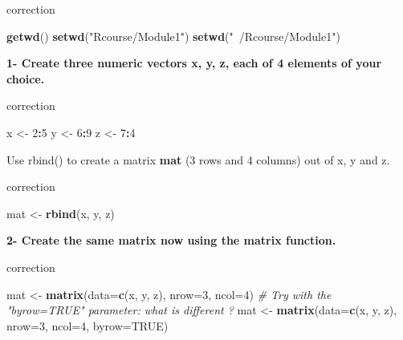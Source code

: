 \documentclass[]{book}
\newenvironment{Shaded}{\begin{snugshade}}{\end{snugshade}}
\newcommand{\CommentTok}[1]{\textcolor[rgb]{0.56,0.35,0.01}{\textit{#1}}}
\newcommand{\DataTypeTok}[1]{\textcolor[rgb]{0.13,0.29,0.53}{#1}}
\newcommand{\DecValTok}[1]{\textcolor[rgb]{0.00,0.00,0.81}{#1}}
\newcommand{\KeywordTok}[1]{\textcolor[rgb]{0.13,0.29,0.53}{\textbf{#1}}}
\newcommand{\NormalTok}[1]{#1}
\newcommand{\OperatorTok}[1]{\textcolor[rgb]{0.81,0.36,0.00}{\textbf{#1}}}
\newcommand{\OtherTok}[1]{\textcolor[rgb]{0.56,0.35,0.01}{#1}}
\newcommand{\StringTok}[1]{\textcolor[rgb]{0.31,0.60,0.02}{#1}}
\begin{document}
correction

\begin{Shaded}
\begin{Highlighting}[]
\KeywordTok{getwd}\NormalTok{()}
\KeywordTok{setwd}\NormalTok{(}\StringTok{"Rcourse/Module1"}\NormalTok{)}
\KeywordTok{setwd}\NormalTok{(}\StringTok{"~/Rcourse/Module1"}\NormalTok{)}
\end{Highlighting}
\end{Shaded}

\textbf{1- Create three numeric vectors x, y, z, each of 4 elements of your choice.}

correction

\begin{Shaded}
\begin{Highlighting}[]
\NormalTok{x <-}\StringTok{ }\DecValTok{2}\OperatorTok{:}\DecValTok{5}
\NormalTok{y <-}\StringTok{ }\DecValTok{6}\OperatorTok{:}\DecValTok{9}
\NormalTok{z <-}\StringTok{ }\DecValTok{7}\OperatorTok{:}\DecValTok{4}
\end{Highlighting}
\end{Shaded}

Use rbind() to create a matrix \textbf{mat} (3 rows and 4 columns) out of x, y and z.

correction

\begin{Shaded}
\begin{Highlighting}[]
\NormalTok{mat <-}\StringTok{ }\KeywordTok{rbind}\NormalTok{(x, y, z)}
\end{Highlighting}
\end{Shaded}

\textbf{2- Create the same matrix now using the matrix function.}

correction

\begin{Shaded}
\begin{Highlighting}[]
\NormalTok{mat <-}\StringTok{ }\KeywordTok{matrix}\NormalTok{(}\DataTypeTok{data=}\KeywordTok{c}\NormalTok{(x, y, z), }\DataTypeTok{nrow=}\DecValTok{3}\NormalTok{, }\DataTypeTok{ncol=}\DecValTok{4}\NormalTok{)}
\CommentTok{# Try with the "byrow=TRUE" parameter: what is different ?}
\NormalTok{mat <-}\StringTok{ }\KeywordTok{matrix}\NormalTok{(}\DataTypeTok{data=}\KeywordTok{c}\NormalTok{(x, y, z), }\DataTypeTok{nrow=}\DecValTok{3}\NormalTok{, }\DataTypeTok{ncol=}\DecValTok{4}\NormalTok{, }\DataTypeTok{byrow=}\OtherTok{TRUE}\NormalTok{)}
\end{Highlighting}
\end{Shaded}
\end{document}
